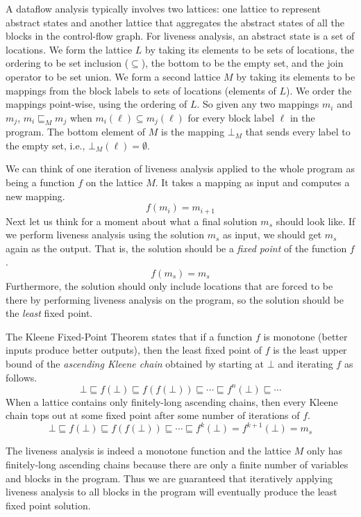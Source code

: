 \documentclass[7x10]{TimesAPriori_MIT}%
\begin{document}
A dataflow analysis typically involves two lattices: one lattice to
represent abstract states and another lattice that aggregates the
abstract states of all the blocks in the control-flow graph.  For
liveness analysis, an abstract state is a set of locations.  We form
the lattice $L$ by taking its elements to be sets of locations, the
ordering to be set inclusion ($\subseteq$), the bottom to be the empty
set, and the join operator to be set union.
%
We form a second lattice $M$ by taking its elements to be mappings
from the block labels to sets of locations (elements of $L$).  We
order the mappings point-wise, using the ordering of $L$. So given any
two mappings $m_i$ and $m_j$, $m_i \sqsubseteq_M m_j$ when $m_i(\ell)
\subseteq m_j(\ell)$ for every block label $\ell$ in the program.  The
bottom element of $M$ is the mapping $\bot_M$ that sends every label
to the empty set, i.e., $\bot_M(\ell) = \emptyset$.

We can think of one iteration of liveness analysis applied to the
whole program as being a function $f$ on the lattice $M$. It takes a
mapping as input and computes a new mapping.
\[
   f(m_i) = m_{i+1}
\]
Next let us think for a moment about what a final solution $m_s$
should look like. If we perform liveness analysis using the solution
$m_s$ as input, we should get $m_s$ again as the output. That is, the
solution should be a \emph{fixed point} of the function $f$.
\[
   f(m_s) = m_s
\]
Furthermore, the solution should only include locations that are
forced to be there by performing liveness analysis on the program, so
the solution should be the \emph{least} fixed point.

The Kleene Fixed-Point Theorem states that if a function $f$ is
monotone (better inputs produce better outputs), then the least fixed
point of $f$ is the least upper bound of the \emph{ascending Kleene
  chain} obtained by starting at $\bot$ and iterating $f$ as
follows.
\[
\bot \sqsubseteq f(\bot) \sqsubseteq f(f(\bot)) \sqsubseteq \cdots
  \sqsubseteq f^n(\bot) \sqsubseteq \cdots
\]
When a lattice contains only finitely-long ascending chains, then
every Kleene chain tops out at some fixed point after some number of
iterations of $f$.
\[
\bot \sqsubseteq f(\bot) \sqsubseteq f(f(\bot)) \sqsubseteq \cdots
\sqsubseteq f^k(\bot) = f^{k+1}(\bot) = m_s
\]

The liveness analysis is indeed a monotone function and the lattice
$M$ only has finitely-long ascending chains because there are only a
finite number of variables and blocks in the program. Thus we are
guaranteed that iteratively applying liveness analysis to all blocks
in the program will eventually produce the least fixed point solution.
\end{document}
